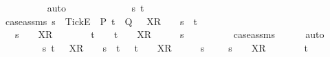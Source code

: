 \begin{isabellebody}
\ \ \ \ \ \ \ \ \isamarkupfalse%
\ auto\isanewline
\ \ \ \ \isamarkupfalse%
\isanewline
\ \ \isamarkupfalse%
\isanewline
\ \ \ \ \isamarkupfalse%
\ s\ t\isanewline
\ \ \ \ \isamarkupfalse%
\ case{\isacharunderscore}assms{\isacharcolon}\ {\isachardoublequoteopen}s\ {\isacharat}\ {\isacharbrackleft}{\isacharbrackleft}Tick{\isacharbrackright}\isactrlsub E{\isacharbrackright}\ {\isasymin}\ P{\isachardoublequoteclose}\ {\isachardoublequoteopen}t\ {\isasymin}\ Q{\isachardoublequoteclose}\ {\isachardoublequoteopen}{\isasymrho}\ {\isacharat}\ {\isacharbrackleft}X{\isacharbrackright}\isactrlsub R\ {\isacharhash}\ {\isasymsigma}\ {\isacharequal}\ s\ {\isacharat}\ t{\isachardoublequoteclose}\isanewline
\ \ \ \ \isamarkupfalse%
\ {\isachardoublequoteopen}{\isacharparenleft}{\isasymexists}\ {\isasymsigma}{\isacharprime}{\isachardot}\ s\ {\isacharequal}\ {\isasymrho}\ {\isacharat}\ {\isacharbrackleft}X{\isacharbrackright}\isactrlsub R\ {\isacharhash}\ {\isasymsigma}{\isacharprime}\ {\isasymand}\ {\isasymsigma}\ {\isacharequal}\ {\isasymsigma}{\isacharprime}\ {\isacharat}\ t{\isacharparenright}\ {\isasymor}\ {\isacharparenleft}{\isasymexists}\ {\isasymrho}{\isacharprime}{\isachardot}\ t\ {\isacharequal}\ {\isasymrho}{\isacharprime}\ {\isacharat}\ {\isacharbrackleft}X{\isacharbrackright}\isactrlsub R\ {\isacharhash}\ {\isasymsigma}\ {\isasymand}\ {\isasymrho}\ {\isacharequal}\ s\ {\isacharat}\ {\isasymrho}{\isacharprime}{\isacharparenright}{\isachardoublequoteclose}\isanewline
\ \ \ \ \ \ \isamarkupfalse%
\ case{\isacharunderscore}assms{\isacharparenleft}{}{\isacharparenright}\isanewline
\ \ \ \ \isamarkupfalse%
\ auto\isanewline
\ \ \ \ \ \ \isamarkupfalse%
\ {\isachardoublequoteopen}{\isasymAnd}\ s\ t{\isachardot}\ {\isasymrho}\ {\isacharat}\ {\isacharbrackleft}X{\isacharbrackright}\isactrlsub R\ {\isacharhash}\ {\isasymsigma}\ {\isacharequal}\ s\ {\isacharat}\ t\ {\isasymLongrightarrow}\ {\isasymforall}{\isasymrho}{\isacharprime}{\isachardot}\ t\ {\isacharequal}\ {\isasymrho}{\isacharprime}\ {\isacharat}\ {\isacharbrackleft}X{\isacharbrackright}\isactrlsub R\ {\isacharhash}\ {\isasymsigma}\ {\isasymlongrightarrow}\ {\isasymrho}\ {\isasymnoteq}\ s\ {\isacharat}\ {\isasymrho}{\isacharprime}\ {\isasymLongrightarrow}\ {\isasymexists}{\isasymsigma}{\isacharprime}{\isachardot}\ s\ {\isacharequal}\ {\isasymrho}\ {\isacharat}\ {\isacharbrackleft}X{\isacharbrackright}\isactrlsub R\ {\isacharhash}\ {\isasymsigma}{\isacharprime}\ {\isasymand}\ {\isasymsigma}\ {\isacharequal}\ {\isasymsigma}{\isacharprime}\ {\isacharat}\ t{\isachardoublequoteclose}\isanewline

\end{isabellebody}

